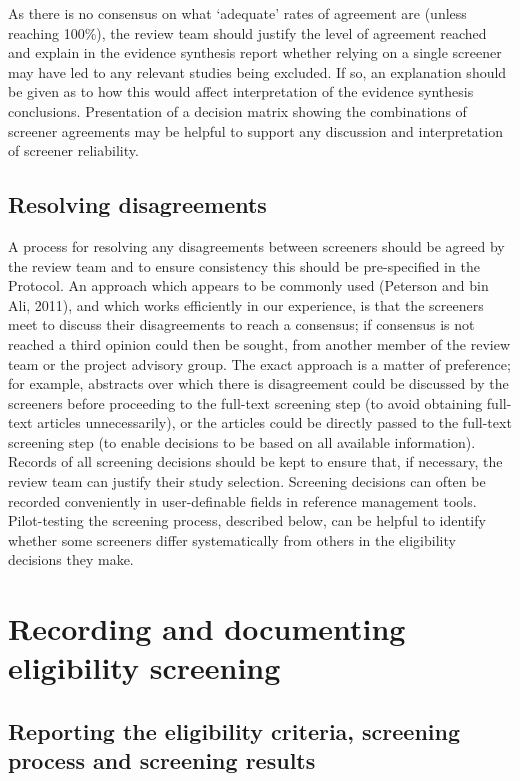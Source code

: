 \documentclass[
  letterpaper,
  DIV=11,
  numbers=noendperiod]{scrreprt}
\begin{document}
As there is no consensus on what `adequate' rates of agreement are
(unless reaching 100\%), the review team should justify the level of
agreement reached and explain in the evidence synthesis report whether
relying on a single screener may have led to any relevant studies being
excluded. If so, an explanation should be given as to how this would
affect interpretation of the evidence synthesis conclusions.
Presentation of a decision matrix showing the combinations of screener
agreements may be helpful to support any discussion and interpretation
of screener reliability.

\subsection{Resolving disagreements}\label{resolving-disagreements-1}

A process for resolving any disagreements between screeners should be
agreed by the review team and to ensure consistency this should be
pre-specified in the Protocol. An approach which appears to be commonly
used (Peterson and bin Ali, 2011), and which works efficiently in our
experience, is that the screeners meet to discuss their disagreements to
reach a consensus; if consensus is not reached a third opinion could
then be sought, from another member of the review team or the project
advisory group. The exact approach is a matter of preference; for
example, abstracts over which there is disagreement could be discussed
by the screeners before proceeding to the full-text screening step (to
avoid obtaining full-text articles unnecessarily), or the articles could
be directly passed to the full-text screening step (to enable decisions
to be based on all available information). Records of all screening
decisions should be kept to ensure that, if necessary, the review team
can justify their study selection. Screening decisions can often be
recorded conveniently in user-definable fields in reference management
tools. Pilot-testing the screening process, described below, can be
helpful to identify whether some screeners differ systematically from
others in the eligibility decisions they make.

\section{Recording and documenting eligibility
screening}\label{recording-and-documenting-eligibility-screening-1}

\subsection{Reporting the eligibility criteria, screening process and
screening
results}\label{reporting-the-eligibility-criteria-screening-process-and-screening-results-1}
\end{document}
